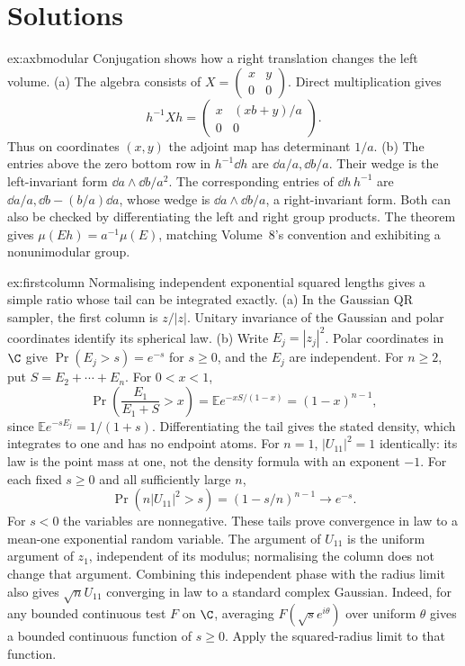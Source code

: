 \section{Solutions}

\begin{solution}{ex:axbmodular}
\idea Conjugation shows how a right translation changes the left volume.
\writeup (a) The algebra consists of
$X=\left(\begin{smallmatrix}x&y\\0&0\end{smallmatrix}\right)$.
Direct multiplication gives
\[
 h^{-1}Xh=\begin{pmatrix}x&(xb+y)/a\\0&0\end{pmatrix}.
\]
Thus on coordinates $(x,y)$ the adjoint map has determinant $1/a$.
(b) The entries above the zero bottom row in $h^{-1}\dd h$ are
$\dd a/a,\dd b/a$. Their wedge is the left-invariant form
$\dd a\wedge\dd b/a^2$.
The corresponding entries of $\dd h\,h^{-1}$ are
$\dd a/a,\dd b-(b/a)\dd a$, whose wedge is
$\dd a\wedge\dd b/a$, a right-invariant form.
Both can also be checked by differentiating the left and right group
products. The theorem gives $\mu(Eh)=a^{-1}\mu(E)$,
matching Volume~8's convention and exhibiting a nonunimodular group.
\end{solution}
\begin{solution}{ex:firstcolumn}
\idea Normalising independent exponential squared lengths gives a simple
ratio whose tail can be integrated exactly.
\writeup (a) In the Gaussian QR sampler, the first column is $z/|z|$.
Unitary invariance of the Gaussian and polar coordinates identify its
spherical law.
(b) Write $E_j=|z_j|^2$. Polar coordinates in $\C$ give
$\Pr(E_j>s)=e^{-s}$ for $s\ge0$, and the $E_j$ are independent.
For $n\ge2$, put $S=E_2+\cdots+E_n$. For $0<x<1$,
\[
 \Pr\left(\frac{E_1}{E_1+S}>x\right)
 =\mathbb E e^{-xS/(1-x)}=(1-x)^{n-1},
\]
since $\mathbb Ee^{-sE_j}=1/(1+s)$.
Differentiating the tail gives the stated density, which integrates to
one and has no endpoint atoms.
For $n=1$, $|U_{11}|^2=1$ identically: its law is the point mass at one,
not the density formula with an exponent $-1$.
For each fixed $s\ge0$ and all sufficiently large $n$,
\[
 \Pr(n|U_{11}|^2>s)=(1-s/n)^{n-1}\longrightarrow e^{-s}.
\]
For $s<0$ the variables are nonnegative. These tails prove convergence
in law to a mean-one exponential random variable.
The argument of $U_{11}$ is the uniform argument of $z_1$, independent
of its modulus; normalising the column does not change that argument.
Combining this independent phase with the radius limit also gives
$\sqrt n U_{11}$ converging in law to a standard complex Gaussian.
Indeed, for any bounded continuous test $F$ on $\C$, averaging
$F(\sqrt s e^{i\theta})$ over uniform $\theta$ gives a bounded continuous
function of $s\ge0$. Apply the squared-radius limit to that function.
\end{solution}
